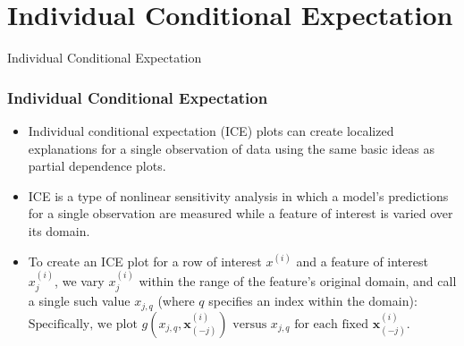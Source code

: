 \section{Individual Conditional Expectation}

\begin{frame}[c]
\Huge{\centerline{Individual Conditional Expectation}}
\end{frame}


\begin{frame}\frametitle{Individual Conditional Expectation}
	\begin{itemize}
		\item Individual conditional expectation (ICE) plots can create localized explanations for a single observation of data using the same basic ideas as partial dependence plots.
		\item ICE is a type of nonlinear sensitivity analysis in which a model's predictions for a single observation are measured while a feature of interest is varied over its domain.
		\item To create an ICE plot for a row of interest $x^{(i)}$ and a feature of interest $x_j^{(i)}$, we vary $x_j^{(i)}$ within the range of the feature's original domain, and call a single such value $x_{j,q}$ (where $q$ specifies an index within the domain):\\
		\bigskip
		 $\text{Specifically, we plot }g(x_{j,q}, \mathbf{x}_{(-j)}^{(i)}) \text{ versus } x_{j,q} \text{ for each fixed }\mathbf{x}_{(-j)}^{(i)}.$
	\end{itemize}
\end{frame}

